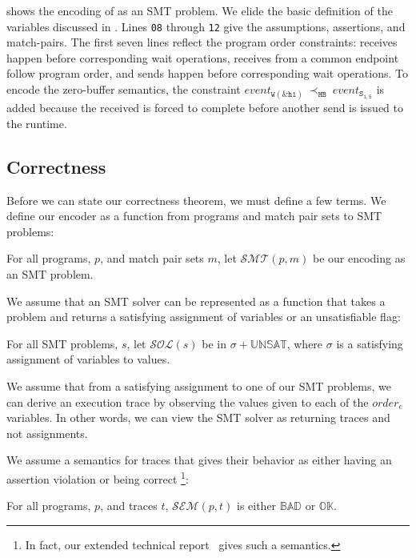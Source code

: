  shows the encoding of  as an
SMT problem. We elide the basic definition of the variables discussed
in . Lines \texttt{08} through \texttt{12} give
the assumptions, assertions, and match-pairs. The first seven lines
reflect the program order constraints: receives happen before
corresponding wait operations, receives from a common endpoint follow
program order, and sends happen before corresponding wait
operations. To encode the zero-buffer semantics, the constraint
$\mathit{event}_\mathtt{W(\&h1)}\ \mathrm{\prec_\mathtt{HB}}\ \mathit{event}_\mathtt{S_{1,5}}$
is added because the received is forced to complete before another
send is issued to the runtime.

\subsection{Correctness}

Before we can state our correctness theorem, we must define a few
terms. We define our encoder as a function from programs and match pair sets
to SMT problems:

\begin{definition}[Encoder]
For all programs, $p$, and match pair sets $m$, let $\mathcal{SMT}(p,
m)$ be our encoding as an SMT problem.
\end{definition}

We assume that an SMT solver can be represented as a function that
takes a problem and returns a satisfying assignment of variables or an
unsatisfiable flag:

\begin{definition}
For all SMT problems, $s$, let $\mathcal{SOL}(s)$ be in $\sigma +
\mathbb{UNSAT}$, where $\sigma$ is a satisfying assignment of
variables to values.
\end{definition}

We assume that from a satisfying assignment to one of our SMT
problems, we can derive an execution trace by observing the values
given to each of the $\textit{order}_{e}$ variables. In other words,
we can view the SMT solver as returning traces and not assignments.

We assume a semantics for traces that gives their behavior as either
having an assertion violation or being correct \footnote{In fact, our
  extended technical report~\cite{extended-version} gives such a
  semantics.}:

\begin{definition}[Semantics]
For all programs, $p$, and traces $t$, $\mathcal{SEM}(p, t)$ is either
$\mathbb{BAD}$ or $\mathbb{OK}$.
\end{definition}

